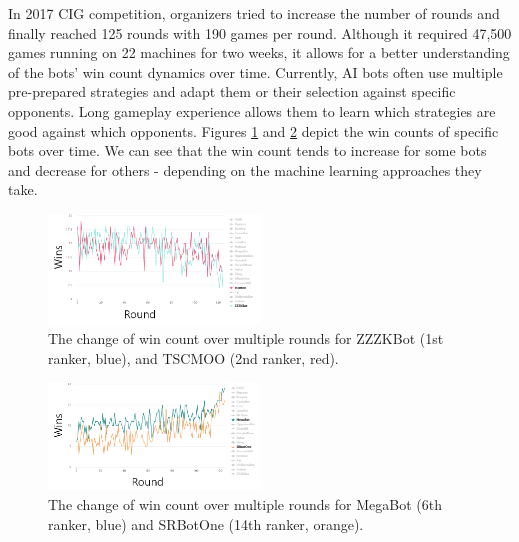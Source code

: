 In 2017 CIG competition, organizers tried to increase the number of rounds and finally reached 125 rounds with 190 games per round. Although it required 47,500 games running on 22 machines for two weeks, it allows for a better understanding of the bots' win count dynamics over time. Currently, AI bots often use multiple pre-prepared strategies and adapt them or their selection against specific opponents. Long gameplay experience allows them to learn which strategies are good against which opponents. 
Figures \ref{figureCIGZZZTSCMOO} and \ref{figureCIGMEGASRBOT} depict the win counts of specific bots over time. We can see that the win count tends to increase for some bots and decrease for others - depending on the machine learning approaches they take. 

\begin{figure}[h]
  \centering
  \includegraphics[width=0.5\textwidth]{fig/cig-tscmoo-zzzkbot-winrate.png}
  \caption{The change of win count over multiple rounds for ZZZKBot (1st ranker, blue), and TSCMOO (2nd ranker, red).}
  \label{figureCIGZZZTSCMOO}
\end{figure} 

\begin{figure}[h]
  \centering
  \includegraphics[width=0.5\textwidth]{fig/cig-megabot-srbotone.png}
  \caption{The change of win count over multiple rounds for MegaBot (6th ranker, blue) and SRBotOne (14th ranker, orange).}
  \label{figureCIGMEGASRBOT}
\end{figure} 


